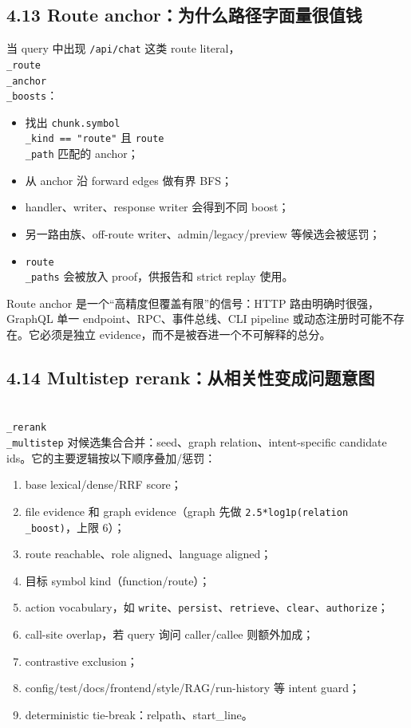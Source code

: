 \documentclass[UTF8,12pt,openany]{ctexbook}
\begin{document}
\subsection{4.13 Route anchor：为什么路径字面量很值钱}

当 query 中出现 \texttt{/api/chat} 这类 route literal，\texttt{\\_route\\_anchor\\_boosts}：\par

\begin{itemize}
\item 找出 \texttt{chunk.symbol\\_kind == "route"} 且 \texttt{route\\_path} 匹配的 anchor；
\item 从 anchor 沿 forward edges 做有界 BFS；
\item handler、writer、response writer 会得到不同 boost；
\item 另一路由族、off-route writer、admin/legacy/preview 等候选会被惩罚；
\item \texttt{route\\_paths} 会被放入 proof，供报告和 strict replay 使用。
\end{itemize}

Route anchor 是一个“高精度但覆盖有限”的信号：HTTP 路由明确时很强，GraphQL 单一 endpoint、RPC、事件总线、CLI pipeline 或动态注册时可能不存在。它必须是独立 evidence，而不是被吞进一个不可解释的总分。\par

\subsection{4.14 Multistep rerank：从相关性变成问题意图}

\texttt{\\_rerank\\_multistep} 对候选集合合并：seed、graph relation、intent-specific candidate ids。它的主要逻辑按以下顺序叠加/惩罚：\par

\begin{enumerate}
\item base lexical/dense/RRF score；
\item file evidence 和 graph evidence（graph 先做 \texttt{2.5*log1p(relation\\_boost)}，上限 6）；
\item route reachable、role aligned、language aligned；
\item 目标 symbol kind（function/route）；
\item action vocabulary，如 \texttt{write}、\texttt{persist}、\texttt{retrieve}、\texttt{clear}、\texttt{authorize}；
\item call-site overlap，若 query 询问 caller/callee 则额外加成；
\item contrastive exclusion；
\item config/test/docs/frontend/style/RAG/run-history 等 intent guard；
\item deterministic tie-break：relpath、start\_line。
\end{enumerate}
\end{document}
